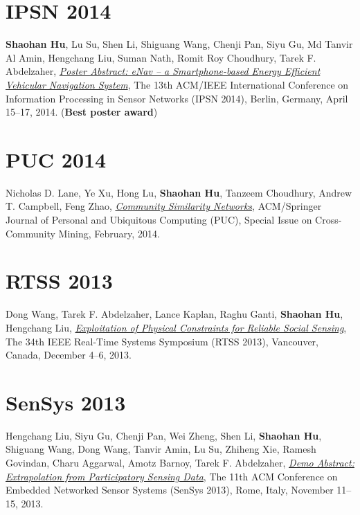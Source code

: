\section{\sc IPSN 2014}\hypertarget{hu2014ipsn}{} \textbf{Shaohan Hu}, Lu Su, Shen Li, Shiguang Wang, Chenji Pan, Siyu Gu, Md Tanvir Al Amin, Hengchang Liu, Suman Nath, Romit Roy Choudhury, Tarek F. Abdelzaher, \href{http://dl.acm.org/citation.cfm?id=2602374}{\emph{Poster Abstract: eNav -- a Smartphone-based Energy Efficient Vehicular Navigation System}}, \textsf{The 13th ACM/IEEE International Conference on Information Processing in Sensor Networks (IPSN 2014)}, Berlin, Germany, April 15--17, 2014. (\textbf{Best poster award})

\section{\sc PUC 2014}\hypertarget{lane2013puc}{} Nicholas D. Lane, Ye Xu, Hong Lu, \textbf{Shaohan Hu}, Tanzeem Choudhury, Andrew T. Campbell, Feng Zhao, \href{http://link.springer.com/article/10.1007/s00779-013-0655-1}{\emph{Community Similarity Networks}}, \textsf{ACM/Springer Journal of Personal and Ubiquitous Computing (PUC), Special Issue on Cross-Community Mining}, February, 2014.

\section{\sc RTSS 2013}\hypertarget{wang2013rtss}{} Dong Wang, Tarek F. Abdelzaher, Lance Kaplan, Raghu Ganti, \textbf{Shaohan Hu}, Hengchang Liu, \href{http://ieeexplore.ieee.org/xpl/articleDetails.jsp?arnumber=6728876}{\emph{Exploitation of Physical Constraints for Reliable Social Sensing}}, \textsf{The 34th IEEE Real-Time Systems Symposium (RTSS 2013)}, Vancouver, Canada, December 4--6, 2013.

\section{\sc SenSys 2013}\hypertarget{liu2013sensys}{} Hengchang Liu, Siyu Gu, Chenji Pan, Wei Zheng, Shen Li, \textbf{Shaohan Hu}, Shiguang Wang, Dong Wang, Tanvir Amin, Lu Su, Zhiheng Xie, Ramesh Govindan, Charu Aggarwal, Amotz Barnoy, Tarek F. Abdelzaher, \href{http://portal.acm.org/citation.cfm?id=2517431}{\emph{Demo Abstract: Extrapolation from Participatory Sensing Data}}, \textsf{The 11th ACM Conference on Embedded Networked Sensor Systems (SenSys 2013)}, Rome, Italy, November 11--15, 2013.

